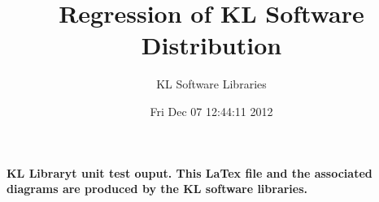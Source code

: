 \documentclass[12pt]{article}
\theoremstyle{definition}
\theoremstyle{remark}
\numberwithin{equation}{section}
\begin{document}
\title{Regression of KL Software Distribution   }
\author{KL Software Libraries}
\date{Fri Dec 07 12:44:11 2012
}
\maketitle
\textbf{ KL Libraryt unit test ouput.  This LaTex file and the associated diagrams 		are produced by the KL software libraries.}
\end{document}
